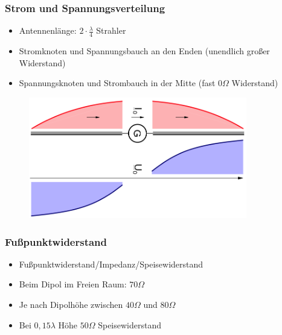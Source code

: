 \begin{frame}
  \frametitle{Strom und Spannungsverteilung}
  \begin{itemize}
    \item Antennenlänge: $2\cdot\frac{\lambda}{4}$ Strahler
    \item Stromknoten und Spannungsbauch an den Enden (unendlich großer Widerstand)
    \item Spannungsknoten und Strombauch in der Mitte (fast $0 \Omega$ Widerstand)
  \end{itemize}
  \begin{center}
    \begin{figure}
      \includegraphics[width=0.85\textwidth,height=.5\textheight,keepaspectratio]{e11/DipolUI.png}
    \end{figure}
  \end{center}
\end{frame}

\begin{frame}
  \frametitle{Fußpunktwiderstand}
  \begin{center}
    \begin{itemize}
      \item Fußpunktwiderstand/Impedanz/Speisewiderstand
      \item Beim Dipol im Freien Raum: $70 \Omega$
      \item Je nach Dipolhöhe zwischen $40 \Omega$ und $80 \Omega$
      \item Bei $0,15 \lambda$ Höhe $50 \Omega$ Speisewiderstand
    \end{itemize}
  \end{center}
\end{frame}

